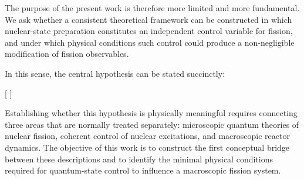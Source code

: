 The purpose of the present work is therefore more limited and more fundamental. We ask whether a consistent theoretical framework can be constructed in which nuclear-state preparation constitutes an independent control variable for fission, and under which physical conditions such control could produce a non-negligible modification of fission observables.

In this sense, the central hypothesis can be stated succinctly:

[
]

Establishing whether this hypothesis is physically meaningful requires connecting three areas that are normally treated separately: microscopic quantum theories of nuclear fission, coherent control of nuclear excitations, and macroscopic reactor dynamics. The objective of this work is to construct the first conceptual bridge between these descriptions and to identify the minimal physical conditions required for quantum-state control to influence a macroscopic fission system.
